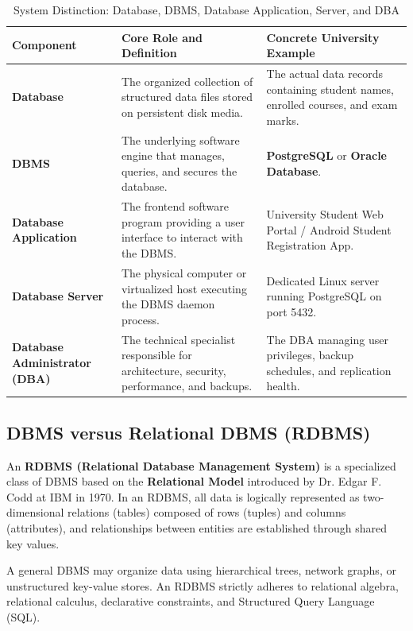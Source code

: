 \begin{table}[htbp]
\centering
\caption{System Distinction: Database, DBMS, Database Application, Server, and DBA}
\label{tab:dbms_layers}
\begin{tabularx}{\textwidth}{p{3.8cm} X X}
\toprule
\textbf{Component} & \textbf{Core Role and Definition} & \textbf{Concrete University Example} \\
\midrule
\textbf{Database} & The organized collection of structured data files stored on persistent disk media. & The actual data records containing student names, enrolled courses, and exam marks. \\
\textbf{DBMS} & The underlying software engine that manages, queries, and secures the database. & \textbf{PostgreSQL} or \textbf{Oracle Database}. \\
\textbf{Database Application} & The frontend software program providing a user interface to interact with the DBMS. & University Student Web Portal / Android Student Registration App. \\
\textbf{Database Server} & The physical computer or virtualized host executing the DBMS daemon process. & Dedicated Linux server running PostgreSQL on port 5432. \\
\textbf{Database Administrator (DBA)} & The technical specialist responsible for architecture, security, performance, and backups. & The DBA managing user privileges, backup schedules, and replication health. \\
\bottomrule
\end{tabularx}
\end{table}

\subsection{DBMS versus Relational DBMS (RDBMS)}

An \textbf{RDBMS (Relational Database Management System)} is a specialized class of DBMS based on the \textbf{Relational Model} introduced by Dr. Edgar F. Codd at IBM in 1970. In an RDBMS, all data is logically represented as two-dimensional relations (tables) composed of rows (tuples) and columns (attributes), and relationships between entities are established through shared key values.

\begin{tcolorbox}[colback=blue!5!white,colframe=blue!60!black,title=\textbf{Crucial Examination Axiom: All RDBMSs are DBMSs, but not all DBMSs are RDBMSs}]
A general DBMS may organize data using hierarchical trees, network graphs, or unstructured key-value stores. An RDBMS strictly adheres to relational algebra, relational calculus, declarative constraints, and Structured Query Language (SQL).
\end{tcolorbox}

